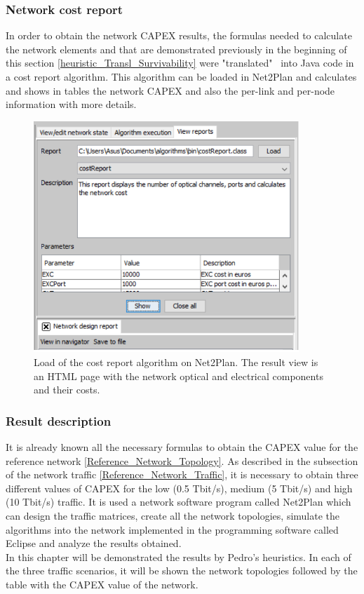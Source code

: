 \subsubsection{Network cost report}

\vspace{11pt}
In order to obtain the network CAPEX results, the formulas needed to calculate the network elements and that are demonstrated previously in the beginning of this section \ref{heuristic_Transl_Survivability} were "translated" \ into Java code in a cost report algorithm. This algorithm can be loaded in Net2Plan and calculates and shows in tables the network CAPEX and also the per-link and per-node information with more details.

\begin{figure}[H]
\centering
\includegraphics[width=10cm]{sdf/heuristic/translucent_survivability/figures/cost_report_translucent}
\caption{Load of the cost report algorithm on Net2Plan. The result view is an HTML page with the network optical and electrical components and their costs.}
\label{cost_report_translucent_surv}
\end{figure}

\newpage
\subsubsection{Result description}\label{result_description_translucent_heuristic_surv}

It is already known all the necessary formulas to obtain the CAPEX value for the reference network \ref{Reference_Network_Topology}. As described in the subsection of the network traffic \ref{Reference_Network_Traffic}, it is necessary to obtain three different values of CAPEX for the low (0.5 Tbit/s), medium (5 Tbit/s) and high (10 Tbit/s) traffic. It is used a network software program called Net2Plan which can design the traffic matrices, create all the network topologies, simulate the algorithms into the network implemented in the programming software called Eclipse and analyze the results obtained.\\
In this chapter will be demonstrated the results by Pedro's heuristics. In each of the three traffic scenarios, it will be shown the network topologies followed by the table with the CAPEX value of the network.\\

